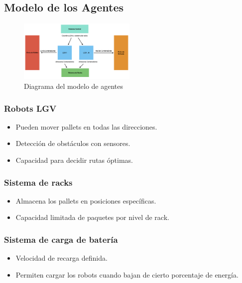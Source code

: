 \documentclass[sjournal]{IEEEtran}
\begin{document}
\subsection{Modelo de los Agentes}

\begin{figure}[h!]
    \centering
    \includegraphics[width=0.5\textwidth]{modeloAgentes.png}
    \caption{Diagrama del modelo de agentes}
    \label{fig:modeloAgentes}
\end{figure}


\subsubsection*{Robots LGV}
\begin{itemize}
    \item Pueden mover pallets en todas las direcciones.
    \item Detección de obstáculos con sensores.
    \item Capacidad para decidir rutas óptimas.
\end{itemize}

\subsubsection*{Sistema de racks}
\begin{itemize}
    \item Almacena los pallets en posiciones específicas.
    \item Capacidad limitada de paquetes por nivel de rack.
\end{itemize}

\subsubsection*{Sistema de carga de batería}
\begin{itemize}
    \item Velocidad de recarga definida.
    \item Permiten cargar los robots cuando bajan de cierto porcentaje de energía.
\end{itemize}
\end{document}
